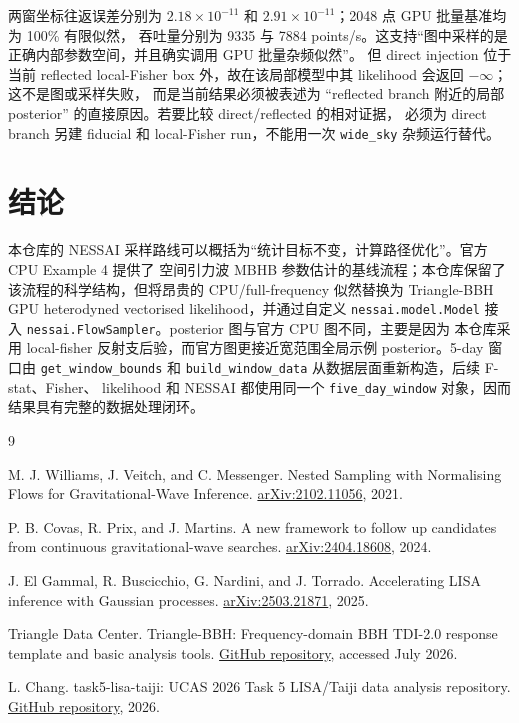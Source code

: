 \documentclass[11pt,a4paper]{ctexart}
\begin{document}
两窗坐标往返误差分别为 $2.18\times10^{-11}$ 和 $2.91\times10^{-11}$；2048 点 GPU 批量基准均为 100\% 有限似然，
吞吐量分别为 9335 与 7884 points/s。这支持“图中采样的是正确内部参数空间，并且确实调用 GPU 批量杂频似然”。
但 direct injection 位于当前 reflected local-Fisher box 外，故在该局部模型中其 likelihood 会返回 $-\infty$；这不是图或采样失败，
而是当前结果必须被表述为 ``reflected branch 附近的局部 posterior'' 的直接原因。若要比较 direct/reflected 的相对证据，
必须为 direct branch 另建 fiducial 和 local-Fisher run，不能用一次 \texttt{wide\_sky} 杂频运行替代。

\section{结论}

本仓库的 NESSAI 采样路线可以概括为“统计目标不变，计算路径优化”。官方 CPU Example 4 提供了
空间引力波 MBHB 参数估计的基线流程；本仓库保留了该流程的科学结构，但将昂贵的 CPU/full-frequency
似然替换为 Triangle-BBH GPU heterodyned vectorised likelihood，并通过自定义
\texttt{nessai.model.Model} 接入 \texttt{nessai.FlowSampler}。posterior 图与官方 CPU 图不同，主要是因为
本仓库采用 local-fisher 反射支后验，而官方图更接近宽范围全局示例 posterior。5-day 窗口由
\texttt{get\_window\_bounds} 和 \texttt{build\_window\_data} 从数据层面重新构造，后续 F-stat、Fisher、
likelihood 和 NESSAI 都使用同一个 \texttt{five\_day\_window} 对象，因而结果具有完整的数据处理闭环。

\begin{thebibliography}{9}

M. J. Williams, J. Veitch, and C. Messenger.
\newblock Nested Sampling with Normalising Flows for Gravitational-Wave Inference.
\newblock \href{https://arxiv.org/abs/2102.11056}{arXiv:2102.11056}, 2021.

P. B. Covas, R. Prix, and J. Martins.
\newblock A new framework to follow up candidates from continuous gravitational-wave searches.
\newblock \href{https://arxiv.org/abs/2404.18608}{arXiv:2404.18608}, 2024.

J. El Gammal, R. Buscicchio, G. Nardini, and J. Torrado.
\newblock Accelerating LISA inference with Gaussian processes.
\newblock \href{https://arxiv.org/abs/2503.21871}{arXiv:2503.21871}, 2025.

Triangle Data Center.
\newblock Triangle-BBH: Frequency-domain BBH TDI-2.0 response template and basic analysis tools.
\newblock \href{https://github.com/TriangleDataCenter/Triangle-BBH}{GitHub repository}, accessed July 2026.

L. Chang.
\newblock task5-lisa-taiji: UCAS 2026 Task 5 LISA/Taiji data analysis repository.
\newblock \href{https://github.com/leichang131-debug/task5-lisa-taiji}{GitHub repository}, 2026.

\end{thebibliography}
\end{document}
